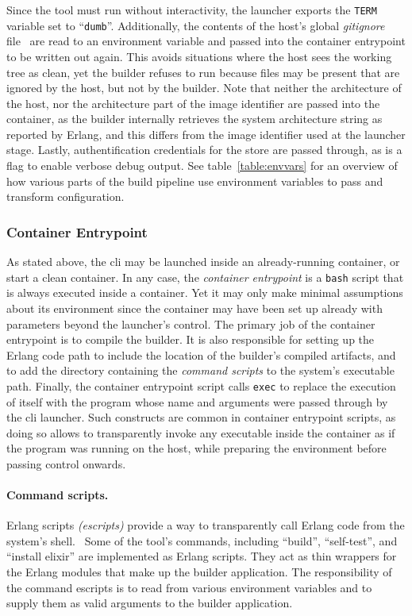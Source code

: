 Since the tool must run without interactivity, the launcher exports the \lstinline|TERM| variable set to ``\lstinline|dumb|''. Additionally, the contents of the host's global \emph{gitignore} file~\cite{man:git} are read to an environment variable and passed into the container entrypoint to be written out again. This avoids situations where the host sees the working tree as clean, yet the builder refuses to run because files may be present that are ignored by the host, but not by the builder. Note that neither the architecture of the host, nor the architecture part of the image identifier are passed into the container, as the builder internally retrieves the system architecture string as reported by Erlang, and this differs from the image identifier used at the launcher stage. Lastly, authentification credentials for the store are passed through, as is a flag to enable verbose debug output. See table~\ref{table:envvars} for an overview of how various parts of the build pipeline use environment variables to pass and transform configuration.

\subsubsection{Container Entrypoint}

As stated above, the \acrshort{cli} may be launched inside an already-running container, or start a clean container. In any case, the \emph{container entrypoint} is a \lstinline|bash| script that is always executed inside a container. Yet it may only make minimal assumptions about its environment since the container may have been set up already with parameters beyond the launcher's control. The primary job of the container entrypoint is to compile the builder. It is also responsible for setting up the Erlang code path to include the location of the builder's compiled artifacts, and to add the directory containing the \emph{command scripts} to the system's executable path. Finally, the container entrypoint script calls \lstinline|exec| to replace the execution of itself with the program whose name and arguments were passed through by the \acrshort{cli} launcher. Such constructs are common in container entrypoint scripts, as doing so allows to transparently invoke any executable inside the container as if the program was running on the host, while preparing the environment before passing control onwards.

\paragraph{Command scripts.} Erlang scripts \emph{(escripts)} provide a way to transparently call Erlang code from the system's shell.~\cite{doc:otp} Some of the tool's commands, including ``build'', ``self-test'', and ``install elixir'' are implemented as Erlang scripts. They act as thin wrappers for the Erlang modules that make up the builder application. The responsibility of the command escripts is to read from various environment variables and to supply them as valid arguments to the builder application.

